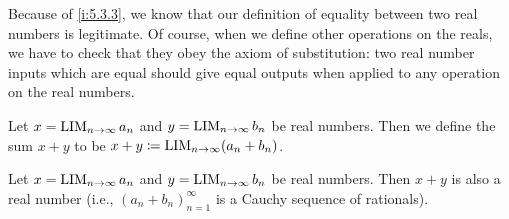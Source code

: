 \begin{note}
  Because of \cref{i:5.3.3}, we know that our definition of equality between two real numbers is legitimate.
  Of course, when we define other operations on the reals, we have to check that they obey the axiom of substitution:
  two real number inputs which are equal should give equal outputs when applied to any operation on the real numbers.
\end{note}

\begin{defn}\label{i:5.3.4}
  Let \(x = \operatorname*{LIM}_{n \to \infty} a_n\) and \(y = \operatorname*{LIM}_{n \to \infty} b_n\) be real numbers.
  Then we define the sum \(x + y\) to be \(x + y \coloneqq \operatorname*{LIM}_{n \to \infty} (a_n + b_n)\).
\end{defn}

\setcounter{thm}{5}
\begin{lem}\label{i:5.3.6}
  Let \(x = \operatorname*{LIM}_{n \to \infty} a_n\) and \(y = \operatorname*{LIM}_{n \to \infty} b_n\) be real numbers.
  Then \(x + y\) is also a real number
  (i.e., \((a_n + b_n)_{n = 1}^{\infty}\) is a Cauchy sequence of rationals).
\end{lem}

